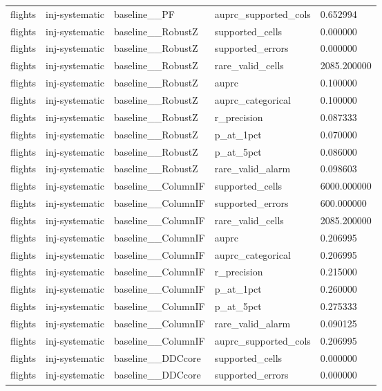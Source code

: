 \begin{tabular}{lllll}
flights & inj-systematic & baseline\_\_PF & auprc\_supported\_cols & 0.652994 \\
flights & inj-systematic & baseline\_\_RobustZ & supported\_cells & 0.000000 \\
flights & inj-systematic & baseline\_\_RobustZ & supported\_errors & 0.000000 \\
flights & inj-systematic & baseline\_\_RobustZ & rare\_valid\_cells & 2085.200000 \\
flights & inj-systematic & baseline\_\_RobustZ & auprc & 0.100000 \\
flights & inj-systematic & baseline\_\_RobustZ & auprc\_categorical & 0.100000 \\
flights & inj-systematic & baseline\_\_RobustZ & r\_precision & 0.087333 \\
flights & inj-systematic & baseline\_\_RobustZ & p\_at\_1pct & 0.070000 \\
flights & inj-systematic & baseline\_\_RobustZ & p\_at\_5pct & 0.086000 \\
flights & inj-systematic & baseline\_\_RobustZ & rare\_valid\_alarm & 0.098603 \\
flights & inj-systematic & baseline\_\_ColumnIF & supported\_cells & 6000.000000 \\
flights & inj-systematic & baseline\_\_ColumnIF & supported\_errors & 600.000000 \\
flights & inj-systematic & baseline\_\_ColumnIF & rare\_valid\_cells & 2085.200000 \\
flights & inj-systematic & baseline\_\_ColumnIF & auprc & 0.206995 \\
flights & inj-systematic & baseline\_\_ColumnIF & auprc\_categorical & 0.206995 \\
flights & inj-systematic & baseline\_\_ColumnIF & r\_precision & 0.215000 \\
flights & inj-systematic & baseline\_\_ColumnIF & p\_at\_1pct & 0.260000 \\
flights & inj-systematic & baseline\_\_ColumnIF & p\_at\_5pct & 0.275333 \\
flights & inj-systematic & baseline\_\_ColumnIF & rare\_valid\_alarm & 0.090125 \\
flights & inj-systematic & baseline\_\_ColumnIF & auprc\_supported\_cols & 0.206995 \\
flights & inj-systematic & baseline\_\_DDCcore & supported\_cells & 0.000000 \\
flights & inj-systematic & baseline\_\_DDCcore & supported\_errors & 0.000000 \\

\end{tabular}
